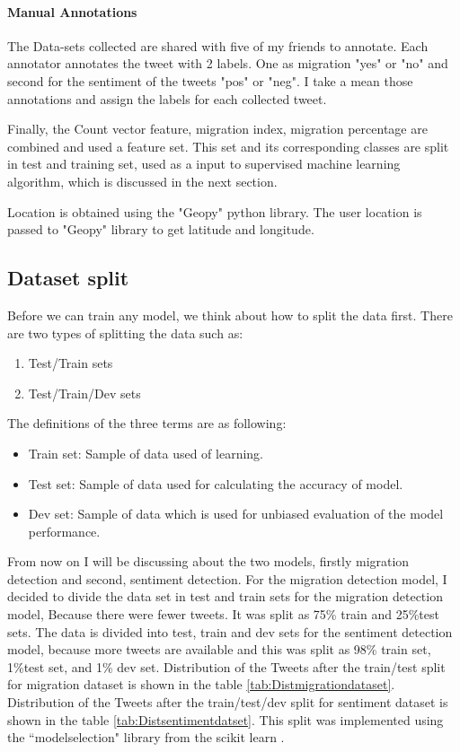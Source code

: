\paragraph{Manual Annotations}
The Data-sets collected are shared with five of my friends to annotate. Each annotator annotates the tweet with 2 labels. One as migration "yes" or "no" and second for the sentiment of the tweets "pos" or "neg". I take a mean those annotations and assign the labels for each collected tweet.


Finally, the Count vector feature, migration index, migration percentage are combined and used a feature set. This set and its corresponding classes are split in test and training set, used as a input to supervised machine learning algorithm, which is discussed in the next section.

    

Location is obtained using the "Geopy" python library. The user location is passed to "Geopy" library to get latitude and longitude. 



\subsection{Dataset split}
Before we can train any model, we think about how to split the data first. There are two types of splitting the data such as:
\begin{enumerate}
    \item Test/Train sets
  \item Test/Train/Dev sets
\end{enumerate}
The definitions of the three terms are as following:
\begin{itemize}
     \item Train set: Sample of data used of learning.
 
    \item Test set: Sample of data used for calculating the accuracy of model.
      \item Dev set: Sample of data which is used for unbiased evaluation of the model performance.
\end{itemize}

From now on I will be discussing about the two models, firstly migration detection and second, sentiment detection. For the migration detection model, I decided to divide the data set in test and train sets for the migration detection model, Because there were fewer tweets. It was split as 75\% train and 25\%test sets. The data is divided into test, train and dev sets for the sentiment detection model, because more tweets are available and this was split as 98\% train set, 1\%test set, and 1\% dev set.
Distribution of the Tweets after the train/test split for migration dataset is shown in the table \ref{tab:Distmigrationdataset}. Distribution of the Tweets after the train/test/dev split for sentiment dataset is shown in the table \ref{tab:Distsentimentdatset}. This split was implemented using the ``modelselection" library from the scikit learn \cite{scikit-learn}.


